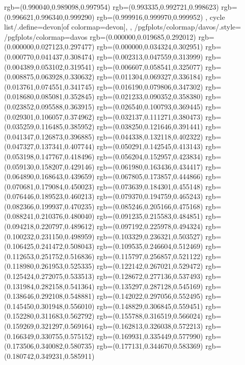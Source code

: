{{{			rgb=(0.990040,0.989098,0.997954)
			rgb=(0.993335,0.992721,0.998623)
			rgb=(0.996621,0.996340,0.999290)
			rgb=(0.999916,0.999970,0.999952)
		},
	cycle list/.define={devon}{[of colormap=devon]},
	},
	/pgfplots/colormap/davos/.style={
		/pgfplots/colormap={davos}{%
			rgb=(0.000000,0.019685,0.292012)
			rgb=(0.000000,0.027123,0.297477)
			rgb=(0.000000,0.034324,0.302951)
			rgb=(0.000770,0.041437,0.308474)
			rgb=(0.002313,0.047559,0.313999)
			rgb=(0.004389,0.053102,0.319541)
			rgb=(0.006607,0.058541,0.325077)
			rgb=(0.008875,0.063928,0.330632)
			rgb=(0.011304,0.069327,0.336184)
			rgb=(0.013761,0.074551,0.341745)
			rgb=(0.016190,0.079806,0.347302)
			rgb=(0.018680,0.085081,0.352845)
			rgb=(0.021233,0.090352,0.358380)
			rgb=(0.023852,0.095588,0.363915)
			rgb=(0.026540,0.100793,0.369445)
			rgb=(0.029301,0.106057,0.374962)
			rgb=(0.032137,0.111271,0.380473)
			rgb=(0.035259,0.116485,0.385952)
			rgb=(0.038250,0.121646,0.391441)
			rgb=(0.041347,0.126873,0.396885)
			rgb=(0.044338,0.132118,0.402322)
			rgb=(0.047327,0.137341,0.407744)
			rgb=(0.050291,0.142545,0.413143)
			rgb=(0.053198,0.147767,0.418496)
			rgb=(0.056204,0.152957,0.423834)
			rgb=(0.059130,0.158207,0.429146)
			rgb=(0.061980,0.163436,0.434417)
			rgb=(0.064890,0.168643,0.439659)
			rgb=(0.067805,0.173857,0.444866)
			rgb=(0.070681,0.179084,0.450023)
			rgb=(0.073639,0.184301,0.455148)
			rgb=(0.076446,0.189523,0.460213)
			rgb=(0.079370,0.194759,0.465243)
			rgb=(0.082366,0.199937,0.470235)
			rgb=(0.085246,0.205166,0.475168)
			rgb=(0.088241,0.210376,0.480040)
			rgb=(0.091235,0.215583,0.484851)
			rgb=(0.094218,0.220797,0.489612)
			rgb=(0.097192,0.225978,0.494324)
			rgb=(0.100232,0.231150,0.498959)
			rgb=(0.103329,0.236321,0.503527)
			rgb=(0.106425,0.241472,0.508043)
			rgb=(0.109535,0.246604,0.512469)
			rgb=(0.112653,0.251752,0.516836)
			rgb=(0.115797,0.256857,0.521122)
			rgb=(0.118980,0.261953,0.525335)
			rgb=(0.122142,0.267021,0.529472)
			rgb=(0.125424,0.272075,0.533513)
			rgb=(0.128672,0.277136,0.537493)
			rgb=(0.131984,0.282158,0.541364)
			rgb=(0.135297,0.287128,0.545169)
			rgb=(0.138646,0.292108,0.548881)
			rgb=(0.142022,0.297056,0.552495)
			rgb=(0.145450,0.301948,0.556010)
			rgb=(0.148829,0.306845,0.559451)
			rgb=(0.152280,0.311683,0.562792)
			rgb=(0.155788,0.316519,0.566024)
			rgb=(0.159269,0.321297,0.569164)
			rgb=(0.162813,0.326038,0.572213)
			rgb=(0.166349,0.330755,0.575152)
			rgb=(0.169931,0.335449,0.577990)
			rgb=(0.173506,0.340082,0.580735)
			rgb=(0.177131,0.344670,0.583369)
			rgb=(0.180742,0.349231,0.585911)
}}}
